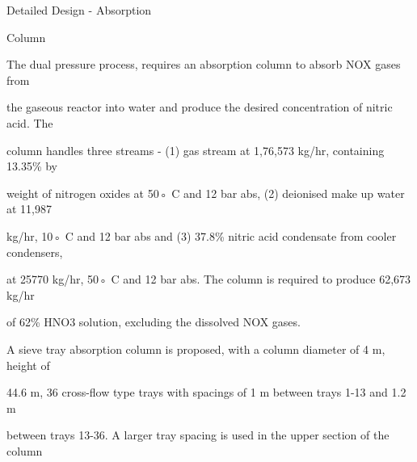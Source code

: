 \documentclass[a4paper,portrait,12pt]{article}
\begin{document}
\begin{flushleft}
Detailed Design - Absorption
\end{flushleft}


\begin{flushleft}
Column
\end{flushleft}


\begin{flushleft}
The dual pressure process, requires an absorption column to absorb NOX gases from
\end{flushleft}


\begin{flushleft}
the gaseous reactor into water and produce the desired concentration of nitric acid. The
\end{flushleft}


\begin{flushleft}
column handles three streams - (1) gas stream at 1,76,573 kg/hr, containing 13.35\% by
\end{flushleft}


\begin{flushleft}
weight of nitrogen oxides at 50◦ C and 12 bar abs, (2) deionised make up water at 11,987
\end{flushleft}


\begin{flushleft}
kg/hr, 10◦ C and 12 bar abs and (3) 37.8\% nitric acid condensate from cooler condensers,
\end{flushleft}


\begin{flushleft}
at 25770 kg/hr, 50◦ C and 12 bar abs. The column is required to produce 62,673 kg/hr
\end{flushleft}


\begin{flushleft}
of 62\% HNO3 solution, excluding the dissolved NOX gases.
\end{flushleft}


\begin{flushleft}
A sieve tray absorption column is proposed, with a column diameter of 4 m, height of
\end{flushleft}


\begin{flushleft}
44.6 m, 36 cross-flow type trays with spacings of 1 m between trays 1-13 and 1.2 m
\end{flushleft}


\begin{flushleft}
between trays 13-36. A larger tray spacing is used in the upper section of the column
\end{flushleft}
\end{document}
